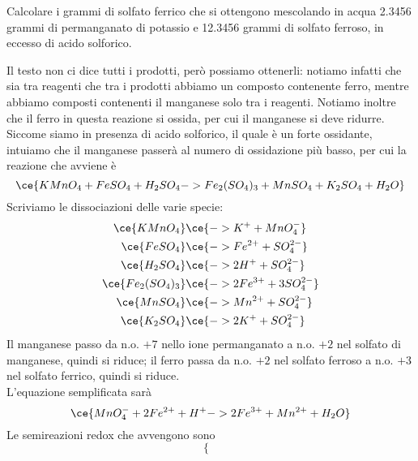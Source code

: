 \begin{esercizio}
    Calcolare i grammi di solfato ferrico che si ottengono mescolando in acqua 2.3456 grammi di permanganato di potassio e 12.3456 grammi di solfato ferroso, in eccesso di acido solforico.
\end{esercizio}
\begin{soluzione}
    Il testo non ci dice tutti i prodotti, però possiamo ottenerli: notiamo infatti che sia tra reagenti che tra i prodotti abbiamo un composto contenente ferro, mentre abbiamo composti contenenti il manganese solo tra i reagenti. Notiamo inoltre che il ferro in questa reazione si ossida, per cui il manganese si deve ridurre. Siccome siamo in presenza di acido solforico, il quale è un forte ossidante, intuiamo che il manganese passerà al numero di ossidazione più basso, per cui la reazione che avviene è
    \begin{equation*}
        \ce{KMnO_4 + FeSO_4 + H_2SO_4 -> Fe_2(SO_4)_3 + MnSO_4 + K_2SO_4 + H_2O}
    \end{equation*}
    Scriviamo le dissociazioni delle varie specie:
    \begin{equation*}
        \begin{split}
            \ce{KMnO_4} & \ce{-> K^+ + MnO_4^-}
            \\
            \ce{FeSO_4} & \ce{-> Fe^{2+} + SO_4^{2-}}
            \\
            \ce{H_2SO_4} & \ce{-> 2H^+ + SO_4^{2-}}
            \\
            \ce{Fe_2(SO_4)_3} & \ce{-> 2Fe^{3+} + 3SO_4^{2-}}
            \\
            \ce{MnSO_4} & \ce{-> Mn^{2+} + SO_4^{2-}}
            \\
            \ce{K_2SO_4} & \ce{-> 2K^+ + SO_4^{2-}}
        \end{split}
    \end{equation*}
    Il manganese passo da n.o. $+7$ nello ione permanganato a n.o. $+2$ nel solfato di manganese, quindi si riduce; il ferro passa da n.o. $+2$ nel solfato ferroso a n.o. $+3$ nel solfato ferrico, quindi si riduce.\\
    L'equazione semplificata sarà
    \begin{equation*}
        \ce{MnO_4^- + 2Fe^{2+} + H^+ -> 2Fe^{3+} + Mn^{2+} + H_2O}
    \end{equation*}
    Le semireazioni redox che avvengono sono
    \begin{equation*}
        \begin{cases}

\end{cases}
\end{equation*}
\end{soluzione}
